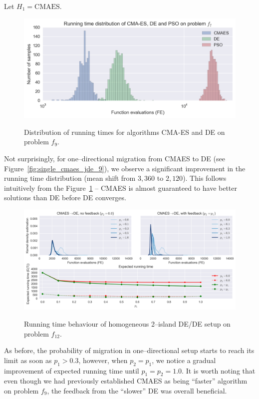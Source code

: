 \documentclass{sig-alternate}
\begin{document}
Let $H_1 = \mbox{CMAES}$.
\begin{figure}[ht]
    \centering
    \includegraphics[width=\columnwidth]{figures/single_distr_7.png}
    \label{fig:distr_cmaes_jde_9}
    \caption{Distribution of running times for algorithms CMA-ES and DE on problem $f_9$.}
\end{figure}
Not surprisingly, for one--directional migration from CMAES to DE (see Figure~\ref{fig:single_cmaes_jde_9}), we observe a significant improvement in the running time distribution (mean shift from $3,360$ to $2,120$).
This follows intuitively from the Figure~\ref{fig:distr_cmaes_jde_9} -- CMAES is almost guaranteed to have better solutions than DE before DE converges.
\begin{figure}[ht]
  \centering
  \includegraphics[width=\columnwidth]{figures/single_cmaes_jde_cec_7.png}
  \label{fig:single_jde_jde_7}
 \caption{Running time behaviour of homogeneous 2--island DE/DE setup on problem $f_{12}$.}
\end{figure}
As before, the probability of migration in one--directional setup starts to reach its limit as soon as $p_1 > 0.3$, however, when $p_2 = p_1$, we notice a gradual improvement of expected running time until $p_1=p_2=1.0$.
It is worth noting that even though we had previously established CMAES as being ``faster'' algorithm on problem $f_9$, the feedback from the ``slower'' DE was overall beneficial.
\end{document}
